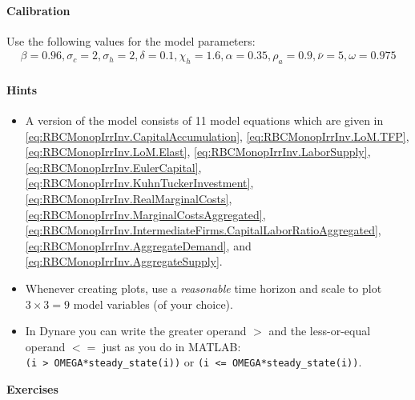 \documentclass[a4paper]{scrartcl}
\begin{document}
\paragraph{Calibration}
Use the following values for the model parameters:
\begin{align*}
\beta = 0.96,
\sigma_c = 2,
\sigma_h = 2,
\delta = 0.1,
\chi_h = 1.6, 
\alpha = 0.35,
\rho_a = 0.9,
\bar{\nu} = 5,
\omega = 0.975
\end{align*}

\paragraph{Hints}

\begin{itemize}
\item
A version of the model consists of 11 model equations which are given in
{\eqref{eq:RBCMonopIrrInv.CapitalAccumulation}},
{\eqref{eq:RBCMonopIrrInv.LoM.TFP}},
{\eqref{eq:RBCMonopIrrInv.LoM.Elast}},
{\eqref{eq:RBCMonopIrrInv.LaborSupply}},
{\eqref{eq:RBCMonopIrrInv.EulerCapital}},
{\eqref{eq:RBCMonopIrrInv.KuhnTuckerInvestment}},
{\eqref{eq:RBCMonopIrrInv.RealMarginalCosts}},
{\eqref{eq:RBCMonopIrrInv.MarginalCostsAggregated}},
{\eqref{eq:RBCMonopIrrInv.IntermediateFirms.CapitalLaborRatioAggregated}},
{\eqref{eq:RBCMonopIrrInv.AggregateDemand}}, and
{\eqref{eq:RBCMonopIrrInv.AggregateSupply}}.

\item
Whenever creating plots, use a \emph{reasonable} time horizon
and scale to plot \(3 \times 3=9\) model variables (of your choice).

\item
In Dynare you can write the greater operand \(>\) and the less-or-equal operand \(<=\) just as you do in MATLAB:\\
\texttt{(i > OMEGA*steady{\_}state{(i)})} or \texttt{(i <= OMEGA*steady{\_}state{(i)})}.
\end{itemize}

\bigskip

\begin{center} \Large \textbf{Exercises} \end{center}
\end{document}
